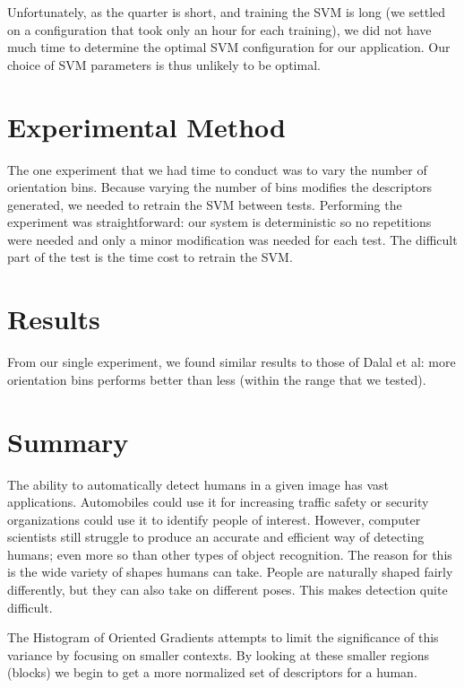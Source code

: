 \documentclass[a4paper,11pt]{article}
\begin{document}
\begin{multicols}{2}
Unfortunately, as the quarter is short, and training the SVM is long (we settled on 
a configuration that took only an hour for each training), we did not have 
much time to determine the optimal SVM configuration for our application.  
Our choice of SVM parameters is thus unlikely to be optimal.

\section{Experimental Method}
The one experiment that we had time to conduct was to vary the number of orientation bins.  
Because varying the number of bins modifies the descriptors generated, we needed to retrain 
the SVM between tests.  Performing the experiment was straightforward:  our system is deterministic 
so no repetitions were needed and only a minor modification was needed for each test.  The difficult 
part of the test is the time cost to retrain the SVM.

\section{Results}
From our single experiment, we found similar results to those of Dalal et al: more orientation bins
performs better than less (within the range that we tested).

\section{Summary}
The ability to automatically detect humans in a given image has vast applications. Automobiles could use 
it for increasing traffic safety or security organizations could use it to identify people of interest.
However, computer scientists still struggle to produce an accurate and efficient way of detecting humans; even
more so than other types of object recognition. The reason for this is the wide variety of shapes humans can take. 
People are naturally shaped fairly differently, but they can also take on different poses. This makes detection 
quite difficult.

The Histogram of Oriented Gradients attempts to limit the significance of this variance by focusing on smaller 
contexts. By looking at these smaller regions (blocks) we begin to get a more normalized set of descriptors for a human.


\end{multicols}
\end{document}
